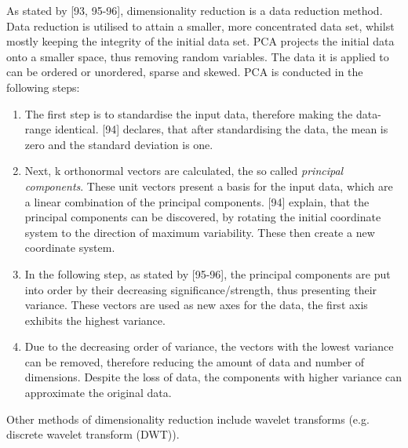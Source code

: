 As stated by \textcite{han2011data}[93, 95-96], dimensionality reduction is a data reduction method. Data reduction is utilised to attain a smaller, more concentrated data set, whilst mostly keeping the integrity of the initial data set. PCA projects the initial data onto a smaller space, thus removing random variables. The data it is applied to can be ordered or unordered, sparse and skewed. PCA is conducted in the following steps:
\begin{enumerate}
  \item The first step is to standardise the input data, therefore making the data-range identical. \textcite{DataMiningAndPredictiveAnalytics}[94] declares, that after standardising the data, the mean is zero and the standard deviation is one.
  \item Next, k orthonormal vectors are calculated, the so called \textit{principal components}. These unit vectors present a basis for the input data, which are a linear combination of the principal components. \textcite{DataMiningAndPredictiveAnalytics}[94] explain, that the principal components can be discovered, by rotating the initial coordinate system to the direction of maximum variability. These then create a new coordinate system. 
  \item In the following step, as stated by \textcite{han2011data}[95-96], the principal components are put into order by their decreasing significance/strength, thus presenting their variance. These vectors are used as new axes for the data, the first axis exhibits the highest variance.
  \item Due to the decreasing order  of variance, the vectors with the lowest variance can be removed, therefore reducing the amount of data and number of dimensions. Despite the loss of data, the components with higher variance can approximate the original data.
\end{enumerate}


Other methods of dimensionality reduction include wavelet transforms (e.g. discrete wavelet transform (DWT)).